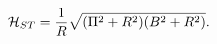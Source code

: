 \begin{equation}
\label{ST1}
{\cal H}_{ST} = \frac{1}{R}
\sqrt{(\Pi^2 + R^2) (B^2 + R^2)}.
\end{equation}


